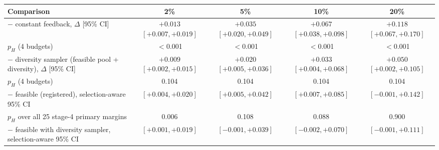 \begin{tabular}{lcccc}
\toprule
Comparison & 2\% & 5\% & 10\% & 20\% \\
\midrule
$-$ constant feedback, $\Delta$ [95\% CI] & ${+}0.013$ $[{+}0.007, {+}0.019]$ & ${+}0.035$ $[{+}0.020, {+}0.049]$ & ${+}0.067$ $[{+}0.038, {+}0.098]$ & ${+}0.118$ $[{+}0.067, {+}0.170]$ \\
\quad $p_H$ (4 budgets) & $<$0.001 & $<$0.001 & $<$0.001 & $<$0.001 \\
$-$ diversity sampler (feasible pool + diversity), $\Delta$ [95\% CI] & ${+}0.009$ $[{+}0.002, {+}0.015]$ & ${+}0.020$ $[{+}0.005, {+}0.036]$ & ${+}0.033$ $[{+}0.004, {+}0.068]$ & ${+}0.050$ $[{+}0.002, {+}0.105]$ \\
\quad $p_H$ (4 budgets) & 0.104 & 0.104 & 0.104 & 0.104 \\
\midrule
$-$ feasible (registered), selection-aware 95\% CI & $[{+}0.004, {+}0.020]$ & $[{+}0.005, {+}0.042]$ & $[{+}0.007, {+}0.085]$ & $[-0.001, {+}0.142]$ \\
\quad $p_H$ over all 25 stage-4 primary margins & 0.006 & 0.108 & 0.088 & 0.900 \\
$-$ feasible with diversity sampler, selection-aware 95\% CI & $[{+}0.001, {+}0.019]$ & $[-0.001, {+}0.039]$ & $[-0.002, {+}0.070]$ & $[-0.001, {+}0.111]$ \\
\bottomrule
\end{tabular}